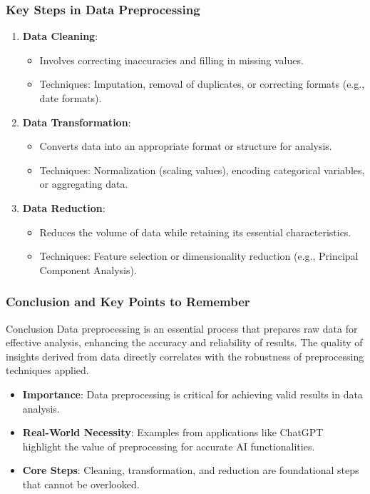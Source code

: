 \documentclass[aspectratio=169]{beamer}
\begin{document}
\begin{frame}[fragile]
    \frametitle{Key Steps in Data Preprocessing}
    \begin{enumerate}
        \item \textbf{Data Cleaning}:
            \begin{itemize}
                \item Involves correcting inaccuracies and filling in missing values.
                \item Techniques: Imputation, removal of duplicates, or correcting formats (e.g., date formats).
            \end{itemize}
        
        \item \textbf{Data Transformation}:
            \begin{itemize}
                \item Converts data into an appropriate format or structure for analysis.
                \item Techniques: Normalization (scaling values), encoding categorical variables, or aggregating data.
            \end{itemize}
        
        \item \textbf{Data Reduction}:
            \begin{itemize}
                \item Reduces the volume of data while retaining its essential characteristics.
                \item Techniques: Feature selection or dimensionality reduction (e.g., Principal Component Analysis).
            \end{itemize}
    \end{enumerate}
\end{frame}

\begin{frame}[fragile]
    \frametitle{Conclusion and Key Points to Remember}
    \begin{block}{Conclusion}
        Data preprocessing is an essential process that prepares raw data for effective analysis, enhancing the accuracy and reliability of results. The quality of insights derived from data directly correlates with the robustness of preprocessing techniques applied.
    \end{block}
    
    \begin{itemize}
        \item \textbf{Importance}: Data preprocessing is critical for achieving valid results in data analysis.
        \item \textbf{Real-World Necessity}: Examples from applications like ChatGPT highlight the value of preprocessing for accurate AI functionalities.
        \item \textbf{Core Steps}: Cleaning, transformation, and reduction are foundational steps that cannot be overlooked.
    \end{itemize}
\end{frame}
\end{document}
